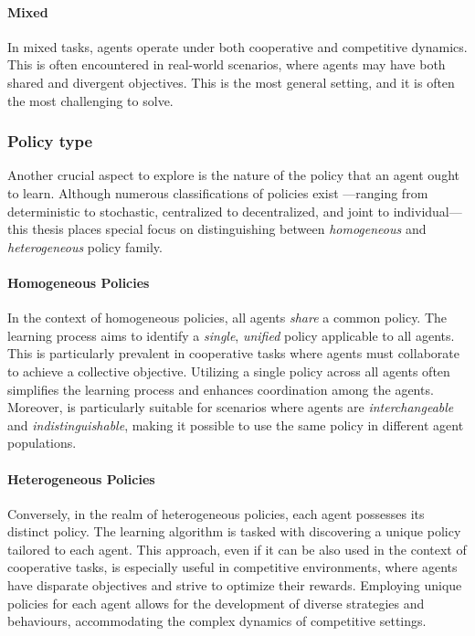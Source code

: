 \paragraph*{Mixed}
In mixed tasks, agents operate under both cooperative and competitive dynamics. 
 This is often encountered in real-world scenarios, 
 where agents may have both shared and divergent objectives. 
This is the most general setting, and it is often the most challenging to solve.
\subsubsection{Policy type}
Another crucial aspect to explore is the nature of the policy that an agent ought to learn. 
Although numerous classifications of policies exist
 ---ranging from deterministic to stochastic, centralized to decentralized, and joint to individual---
 this thesis places special focus on distinguishing between \emph{homogeneous} and \emph{heterogeneous} policy family.

\paragraph*{Homogeneous Policies}
In the context of homogeneous policies, 
 all agents \emph{share} a common policy. 
 The learning process aims to identify a \emph{single}, \emph{unified} policy applicable to all agents. 
 This is particularly prevalent in cooperative tasks where agents must collaborate to achieve a collective objective. 
 Utilizing a single policy across all agents often simplifies the learning process and enhances coordination among the agents.
 Moreover, is particularly suitable for scenarios where agents are \emph{interchangeable} and \emph{indistinguishable}, 
 making it possible to use the same policy in different agent populations.
\paragraph*{Heterogeneous Policies}
Conversely, in the realm of heterogeneous policies, 
 each agent possesses its distinct policy. 
 The learning algorithm is tasked with discovering a unique policy tailored to each agent. 
 This approach, even if it can be also used in the context of cooperative tasks, 
 is especially useful in competitive environments, 
 where agents have disparate objectives and strive to optimize their rewards. 
 Employing unique policies for each agent allows for the development of diverse strategies and behaviours, 
 accommodating the complex dynamics of competitive settings.
